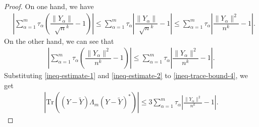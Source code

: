 \documentclass[12pt]{article}
\numberwithin{equation}{section} \theoremstyle{plain}
\def\Tr{\mathrm {Tr}}
\begin{document}
\begin{proof}
On one hand, we have
\begin{align} \label{ineq-estimate-1}
    & \left| \sum_{\alpha=1}^m \tau_\alpha \left( \dfrac{\|Y_\alpha\|}{\sqrt n^k} - 1 \right) \right|
    \le \sum_{\alpha=1}^m \tau_\alpha \left| \dfrac{\|Y_\alpha\|}{\sqrt n^k} - 1 \right|
    \le \sum_{\alpha=1}^m \tau_\alpha \left| \dfrac{\|Y_\alpha\|^2}{n^k} - 1 \right|.
\end{align}
On the other hand, we can see that
\begin{align} \label{ineq-estimate-2}
    \left| \sum_{\alpha=1}^m \tau_\alpha \left( \dfrac{\|Y_\alpha\|^2}{n^k} - 1 \right) \right|
    \le \sum_{\alpha=1}^m \tau_\alpha \left| \dfrac{\|Y_\alpha\|^2}{n^k} - 1 \right|.
\end{align}
Substituting \eqref{ineq-estimate-1} and \eqref{ineq-estimate-2} to \eqref{ineq-trace-bound-4}, we get
\begin{align} \label{ineq-trace-bound-5}
    \left| \Tr \left( \left( Y - \widetilde Y \right) \Lambda_m \left( Y - \widetilde Y \right)^* \right) \right|
    \le 3 \sum_{\alpha=1}^m \tau_\alpha \left| \frac{\|Y_\alpha\|^2}{n^k} - 1 \right|.
\end{align}


\end{proof}
\end{document}
